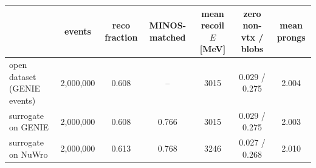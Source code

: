\begin{tabular}{lcccccc}
\toprule
 & events & reco fraction & MINOS-matched & mean recoil $E$ [MeV] & zero non-vtx / blobs & mean prongs \\
\midrule
open dataset (GENIE events) & 2,000,000 & 0.608 & -- & 3015 & 0.029 / 0.275 & 2.004 \\
surrogate on GENIE & 2,000,000 & 0.608 & 0.766 & 3015 & 0.029 / 0.275 & 2.003 \\
surrogate on NuWro & 2,000,000 & 0.613 & 0.768 & 3246 & 0.027 / 0.268 & 2.010 \\
\bottomrule
\end{tabular}
